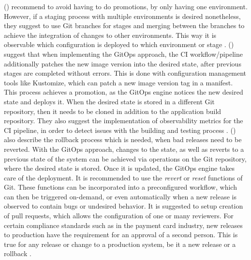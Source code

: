 \citeauthor{gitopsCloudnativeCDInnoq} (\citeyear{gitopsCloudnativeCDInnoq})
recommend to avoid having to do promotions,
by only having one environment.
However, if a staging process with multiple environments is desired
nonetheless, they suggest to use Git branches for stages and merging
between the branches to achieve the integration of changes to other environments.
This way it is observable which configuration is deployed to which environment or stage \autocite{gitopsCloudnativeCDInnoq}.
%
\citeauthor{gitopsAndKubernetes2021continuous} (\citeyear{gitopsAndKubernetes2021continuous})
suggest that when implementing the GitOps approach,
the CI workflow/pipeline additionally patches the new image version into
the desired state,
after previous stages are completed without errors.
This is done with configuration management tools like Kustomize,
which can patch a new image version tag in a manifest.
This process achieves a promotion, as the GitOps engine notices the new desired state
and deploys it.
When the desired state is stored in a different Git repository,
then it needs to be cloned in addition to the application build repository.
They
also suggest the implementation of observability metrics for the CI pipeline,
in order to detect issues with the building and testing process
\autocite{gitopsAndKubernetes2021continuous}.
%
\citeauthor{gitopsAndKubernetes2021continuous} (\citeyear{gitopsAndKubernetes2021continuous})
also describe the rollback process which is needed,
when bad releases need to be reverted.
With the GitOps approach, changes to the state, as well as reverts to a previous state
of the system can be achieved via operations on the Git repository,
where the desired state is stored. Once it is updated, the GitOps engine takes care of the deployment.
It is recommended to use the \textit{revert} or \textit{reset} functions of Git.
These functions can be incorporated into a preconfigured workflow,
which can then be triggered on-demand,
or even automatically when a new release is observed to contain bugs or undesired behavior.
It is suggested to setup creation of pull requests,
which allows the configuration of one or many reviewers.
For certain compliance standards such as in the payment card industry,
new releases to production have the requirement for an approval of a second person.
This is true for any release or change to a production system,
be it a new release or a rollback
\autocite{gitopsAndKubernetes2021continuous}.

















